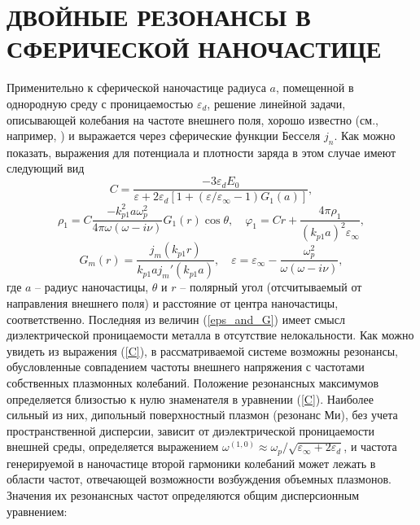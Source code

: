 \documentclass[12pt, a4paper]{article}
\def \eps {\varepsilon}
\def \w {\omega}
\def \ph {\varphi}
\begin{document}
\section{ДВОЙНЫЕ РЕЗОНАНСЫ В СФЕРИЧЕСКОЙ НАНОЧАСТИЦЕ}
Применительно к сферической наночастице радиуса $a$, помещенной в однородную среду с проницаемостью $\eps_d$, решение линейной задачи, описывающей колебания на частоте внешнего поля, хорошо известно (см., например, \cite{HuaGersten1986}) и выражается через сферические функции Бесселя $j_n$. Как можно показать, выражения для потенциала и плотности заряда в этом случае имеют следующий вид
\begin{equation} 
	\label{C}
	C= \frac{-3\eps_d E_0}{\eps + 2\eps_d [1 + (\eps/\eps_\infty - 1) G_1(a) ]},  
\end{equation}
\begin{equation} 
	\label{rho_and_phi}
	\rho_1 = C \frac{-k_{p1}^2a\w_p^2}{4\pi\w(\w - i \nu) } G_1(r)\cos\theta, \quad \ph_1 = C r + \frac{4\pi \rho_1 }{(k_{p1}a)^2 \eps_\infty},
\end{equation}
\begin{equation}
	\label{eps_and_G}
		 G_m(r) =\frac{j_m(k_{p1}r)}{k_{p1}a j_m'(k_{p1}a)},\quad
	\eps = \eps_\infty - \frac{\w_p^2}{\w(\w - i\nu)},
\end{equation}
где $a$ -- радиус наночастицы, $\theta$ и $r$  -- полярный угол (отсчитываемый от направления внешнего поля) и расстояние от центра наночастицы, соответственно. Последняя из величин (\ref{eps_and_G}) имеет смысл диэлектрической проницаемости металла в отсутствие нелокальности. Как можно увидеть из выражения (\ref{C}),  в рассматриваемой
системе возможны резонансы, обусловленные совпадением частоты
внешнего напряжения с частотами собственных плазмонных колебаний.
Положение резонансных максимумов определяется близостью к нулю знаменателя в уравнении (\ref{C}). 
Наиболее сильный из них, дипольный поверхностный плазмон (резонанс Ми), без учета пространственной дисперсии, зависит от диэлектрической проницаемости внешней среды, определяется выражением $\w^{(1,0)} \approx \w_p / \sqrt{\eps_\infty + 2\eps_d}  $, и частота генерируемой в наночастице второй гармоники колебаний может лежать в области частот, отвечающей возможности возбуждения объемных плазмонов. Значения их резонансных частот определяются общим дисперсионным уравнением:
\end{document}

